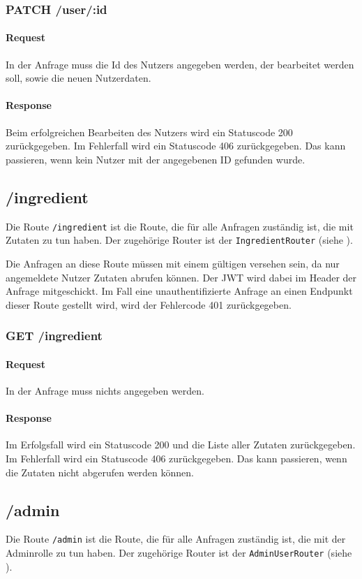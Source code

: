 \documentclass{entwurfsheft}
\begin{document}
\begin{sloppypar}
\subsubsection*{PATCH /user/:id}
\paragraph{Request}
In der Anfrage muss die Id des Nutzers angegeben werden, der bearbeitet werden soll, sowie die neuen Nutzerdaten.
\paragraph{Response}
Beim erfolgreichen Bearbeiten des Nutzers wird ein Statuscode 200 zurückgegeben.
Im Fehlerfall wird ein Statuscode 406 zurückgegeben. Das kann passieren, wenn kein Nutzer mit der angegebenen ID gefunden wurde.

\subsection{/ingredient}
Die Route \texttt{/ingredient} ist die Route, die für alle Anfragen zuständig ist, die mit Zutaten zu tun haben.
Der zugehörige Router ist der \texttt{IngredientRouter} (siehe ).

Die Anfragen an diese Route müssen mit einem gültigen  versehen sein, da nur angemeldete Nutzer Zutaten abrufen können.
Der JWT wird dabei im Header der Anfrage mitgeschickt.
Im Fall eine unauthentifizierte Anfrage an einen Endpunkt dieser Route gestellt wird, wird der Fehlercode 401 zurückgegeben.


\subsubsection*{GET /ingredient}
\paragraph{Request}
In der Anfrage muss nichts angegeben werden.
\paragraph{Response}
Im Erfolgsfall wird ein Statuscode 200 und die Liste aller Zutaten zurückgegeben. Im Fehlerfall wird ein Statuscode 406 zurückgegeben. Das kann passieren, wenn die Zutaten nicht abgerufen werden können.

\subsection{/admin}
Die Route \texttt{/admin} ist die Route, die für alle Anfragen zuständig ist, die mit der Adminrolle zu tun haben.
Der zugehörige Router ist der \texttt{AdminUserRouter} (siehe ).


\end{sloppypar}
\end{document}
